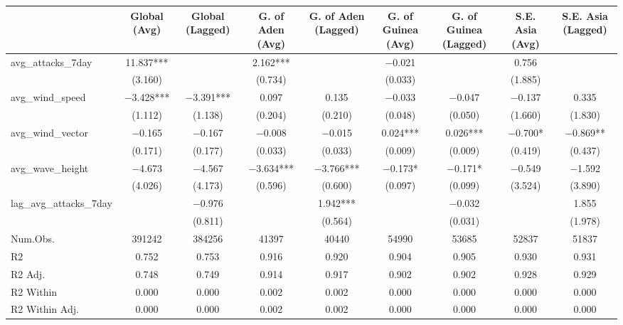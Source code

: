 \begin{table}
\centering
\begin{tabular}[t]{lcccccccc}
\toprule
  & Global (Avg) & Global (Lagged) & G. of Aden (Avg) & G. of Aden (Lagged) & G. of Guinea (Avg) & G. of Guinea (Lagged) & S.E. Asia (Avg) & S.E. Asia (Lagged)\\
\midrule
avg\_attacks\_7day & \num{11.837}*** &  & \num{2.162}*** &  & \num{-0.021} &  & \num{0.756} & \\
 & (\num{3.160}) &  & (\num{0.734}) &  & (\num{0.033}) &  & (\num{1.885}) & \\
avg\_wind\_speed & \num{-3.428}*** & \num{-3.391}*** & \num{0.097} & \num{0.135} & \num{-0.033} & \num{-0.047} & \num{-0.137} & \num{0.335}\\
 & (\num{1.112}) & (\num{1.138}) & (\num{0.204}) & (\num{0.210}) & (\num{0.048}) & (\num{0.050}) & (\num{1.660}) & (\num{1.830})\\
avg\_wind\_vector & \num{-0.165} & \num{-0.167} & \num{-0.008} & \num{-0.015} & \num{0.024}*** & \num{0.026}*** & \num{-0.700}* & \num{-0.869}**\\
 & (\num{0.171}) & (\num{0.177}) & (\num{0.033}) & (\num{0.033}) & (\num{0.009}) & (\num{0.009}) & (\num{0.419}) & (\num{0.437})\\
avg\_wave\_height & \num{-4.673} & \num{-4.567} & \num{-3.634}*** & \num{-3.766}*** & \num{-0.173}* & \num{-0.171}* & \num{-0.549} & \num{-1.592}\\
 & (\num{4.026}) & (\num{4.173}) & (\num{0.596}) & (\num{0.600}) & (\num{0.097}) & (\num{0.099}) & (\num{3.524}) & (\num{3.890})\\
lag\_avg\_attacks\_7day &  & \num{-0.976} &  & \num{1.942}*** &  & \num{-0.032} &  & \num{1.855}\\
 &  & (\num{0.811}) &  & (\num{0.564}) &  & (\num{0.031}) &  & (\num{1.978})\\
\midrule
Num.Obs. & \num{391242} & \num{384256} & \num{41397} & \num{40440} & \num{54990} & \num{53685} & \num{52837} & \num{51837}\\
R2 & \num{0.752} & \num{0.753} & \num{0.916} & \num{0.920} & \num{0.904} & \num{0.905} & \num{0.930} & \num{0.931}\\
R2 Adj. & \num{0.748} & \num{0.749} & \num{0.914} & \num{0.917} & \num{0.902} & \num{0.902} & \num{0.928} & \num{0.929}\\
R2 Within & \num{0.000} & \num{0.000} & \num{0.002} & \num{0.002} & \num{0.000} & \num{0.000} & \num{0.000} & \num{0.000}\\
R2 Within Adj. & \num{0.000} & \num{0.000} & \num{0.002} & \num{0.002} & \num{0.000} & \num{0.000} & \num{0.000} & \num{0.000}\\

\end{tabular}
\end{table}
